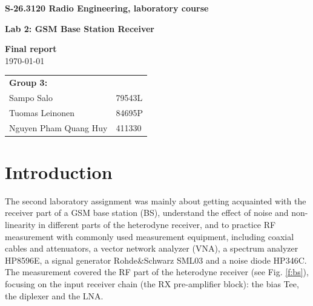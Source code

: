 \documentclass[a4paper, 12pt]{article}
\begin{document}
\begin{titlepage}
\pagestyle{empty}
\begin{center}

\vspace*{3cm}
\noindent\LARGE{\textbf{S-26.3120 Radio Engineering, laboratory course}}

\vspace*{2cm}

\Large{\textbf{Lab 2: GSM Base Station Receiver}}\\

\vspace*{1.5cm}

\large{\textbf{Final report}}\\
\vspace{1.5cm}
\large{\today}
	
\vspace*{3cm}
\large{
	\begin{tabular}{l l}
		\textbf{Group 3:} 	& \\
		Sampo Salo			& 79543L	\\
		Tuomas Leinonen 	& 84695P	\\
		Nguyen Pham Quang Huy			& 411330		
	\end{tabular}
}

\end{center}

\end{titlepage}


\section{Introduction}

The second laboratory assignment was mainly about getting acquainted with the receiver part of a GSM base station (BS), understand the effect of noise and non-linearity in different parts of the heterodyne receiver, and to practice RF measurement with commonly used measurement equipment, including coaxial cables and attenuators, a vector network analyzer (VNA), a spectrum analyzer HP8596E, a signal generator Rohde\&Schwarz SML03 and a noise diode HP346C. The measurement covered the RF part of the heterodyne receiver (see Fig. \ref{f:bs}), focusing on the input receiver chain (the RX pre-amplifier block): the bias Tee, the diplexer and the LNA.
\\
\end{document}
